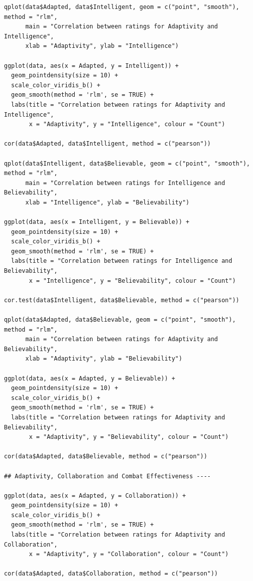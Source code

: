 \documentclass{IEEEtran}
\begin{document}
\begin{verbatim}
qplot(data$Adapted, data$Intelligent, geom = c("point", "smooth"), method = "rlm",
      main = "Correlation between ratings for Adaptivity and Intelligence", 
      xlab = "Adaptivity", ylab = "Intelligence")

ggplot(data, aes(x = Adapted, y = Intelligent)) +
  geom_pointdensity(size = 10) +
  scale_color_viridis_b() + 
  geom_smooth(method = 'rlm', se = TRUE) +
  labs(title = "Correlation between ratings for Adaptivity and Intelligence",
       x = "Adaptivity", y = "Intelligence", colour = "Count")

cor(data$Adapted, data$Intelligent, method = c("pearson"))

qplot(data$Intelligent, data$Believable, geom = c("point", "smooth"), method = "rlm",
      main = "Correlation between ratings for Intelligence and Believability", 
      xlab = "Intelligence", ylab = "Believability")

ggplot(data, aes(x = Intelligent, y = Believable)) +
  geom_pointdensity(size = 10) +
  scale_color_viridis_b() + 
  geom_smooth(method = 'rlm', se = TRUE) +
  labs(title = "Correlation between ratings for Intelligence and Believability",
       x = "Intelligence", y = "Believability", colour = "Count")

cor.test(data$Intelligent, data$Believable, method = c("pearson"))

qplot(data$Adapted, data$Believable, geom = c("point", "smooth"), method = "rlm",
      main = "Correlation between ratings for Adaptivity and Believability", 
      xlab = "Adaptivity", ylab = "Believability")

ggplot(data, aes(x = Adapted, y = Believable)) +
  geom_pointdensity(size = 10) +
  scale_color_viridis_b() + 
  geom_smooth(method = 'rlm', se = TRUE) +
  labs(title = "Correlation between ratings for Adaptivity and Believability",
       x = "Adaptivity", y = "Believability", colour = "Count")

cor(data$Adapted, data$Believable, method = c("pearson"))

## Adaptivity, Collaboration and Combat Effectiveness ----

ggplot(data, aes(x = Adapted, y = Collaboration)) +
  geom_pointdensity(size = 10) +
  scale_color_viridis_b() + 
  geom_smooth(method = 'rlm', se = TRUE) +
  labs(title = "Correlation between ratings for Adaptivity and Collaboration",
       x = "Adaptivity", y = "Collaboration", colour = "Count")

cor(data$Adapted, data$Collaboration, method = c("pearson"))


\end{verbatim}
\end{document}
